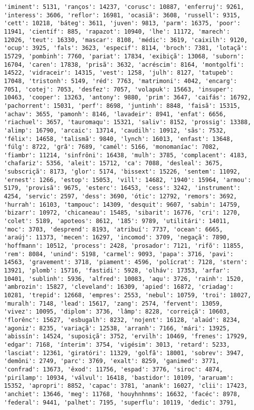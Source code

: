 \begin{Verbatim}[commandchars=\\\{\}]
'iminent': 5131, 'ranços': 14237, 'corusc': 10887, 'enferruj': 9261, 'interess': 3606, 'reflor': 16981, 'ocasiã': 3608, 'russell': 9315, 'cett': 10218, 'báteg': 3611, 'juven': 9813, 'parm': 16375, 'poor': 11941, 'científ': 885, 'rapazot': 10940, 'lhe': 11172, 'marech': 12026, 'teut': 16330, 'mascar': 8108, 'médic': 3619, 'caixilh': 9120, 'ocup': 3925, 'fals': 3623, 'especif': 8114, 'broch': 7381, 'lotaçã': 15729, 'pombinh': 7760, 'pariat': 17834, 'exibiçã': 13068, 'suborn': 16704, 'caren': 17838, 'prisã': 3632, 'acréscim': 8164, 'montgolfi': 14522, 'vidraceir': 14315, 'vest': 1258, 'julh': 8127, 'tatupeb': 17048, 'tristonh': 5149, 'réd': 7763, 'matrimoni': 4042, 'encarg': 7051, 'cotej': 7053, 'desfez': 7057, 'volapuk': 15663, 'insuper': 10463, 'cooper': 13263, 'antony': 9880, 'prim': 3647, 'caifás': 16792, 'pachorrent': 15031, 'perf': 8698, 'juntinh': 8848, 'faisã': 15315, 'achav': 3655, 'pamonh': 8146, 'lavadeir': 8941, 'enfat': 6656, 'riachuel': 3657, 'tauromaqu': 15321, 'saliv': 8152, 'prossig': 13388, 'alimp': 16790, 'arcaic': 13714, 'caudilh': 10912, 'sãs': 7532, 'félix': 14658, 'talismã': 9840, 'lynch': 16013, 'enfast': 13648, 'fúlg': 8722, 'grã': 7689, 'camél': 5166, 'monomaníac': 7082, 'fiambr': 11214, 'sinfrôni': 16438, 'mulh': 3785, 'complacent': 4183, 'chafariz': 5356, 'aleit': 15712, 'ca': 7088, 'desleal': 3675, 'subscriçã': 8173, 'glor': 5174, 'bissext': 15226, 'sentem': 11092, 'ernest': 1266, 'estop': 15053, 'vill': 14682, '1940': 15964, 'armou': 5179, 'provisã': 9675, 'esterc': 16453, 'cess': 3242, 'instrument': 4254, 'servic': 2597, 'dess': 3690, 'ótic': 12792, 'remors': 3692, 'hurrah': 16103, 'tampouc': 14309, 'desquit': 9607, 'sabin': 14759, 'bizarr': 10972, 'chicaneau': 15485, 'sibarit': 16776, 'cri': 1270, 'colet': 5189, 'apoteos': 8612, '185': 9789, 'utilitári': 14011, 'moc': 3703, 'desprend': 8193, 'atribuí': 7737, 'ocean': 6665, 'araúj': 11373, 'mecen': 16297, 'incomod': 3709, 'negaçã': 7890, 'hoffmann': 10512, 'process': 2428, 'prosador': 7121, 'rifõ': 11855, 'rem': 8084, 'unind': 5198, 'carmel': 9093, 'papa': 3716, 'pavi': 14563, 'gravement': 3718, 'piament': 4596, 'polícrat': 7128, 'stern': 13921, 'plomb': 15716, 'fastidi': 5928, 'olháv': 17353, 'arfar': 10401, 'sublinh': 5936, 'alfred': 10083, 'aqu': 3726, 'rainh': 1520, 'ambrozin': 15827, 'cleveland': 16309, 'apied': 16872, 'criadag': 10281, 'trepid': 12668, 'empres': 2553, 'nebul': 10759, 'troi': 18027, 'muralh': 7148, 'lead': 15617, 'zang': 2574, 'fervent': 13059, 'vivez': 10095, 'diplom': 3736, 'lâmp': 8228, 'correiçã': 10603, 'florênc': 15627, 'esbugalh': 8232, 'nojent': 16128, 'alaúd': 8234, 'agoniz': 8235, 'variaçã': 12538, 'arranh': 7166, 'mári': 13925, 'abissín': 14524, 'suposiçã': 3752, 'ervilh': 10469, 'frenes': 17929, 'edgar': 7168, 'ínterim': 3754, 'vigésim': 3013, 'retard': 5233, 'lasciat': 12361, 'giratóri': 11329, 'golfã': 18001, 'sobrev': 3947, 'demôni': 2749, 'parc': 3769, 'exalt': 8259, 'ganimed': 3771, 'confrad': 13673, 'êxod': 11756, 'espad': 3776, 'siroc': 4874, 'pirilamp': 10934, 'válvul': 16418, 'bastidor': 10109, 'araruam': 15352, 'apropri': 8852, 'capac': 3781, 'anank': 16027, 'clii': 17423, 'anchiet': 13646, 'meg': 11768, 'houyhnhnms': 16632, 'facéc': 8978, 'federal': 9441, 'palhet': 7195, 'superflu': 10119, 'dedic': 3791, 
\end{Verbatim}
